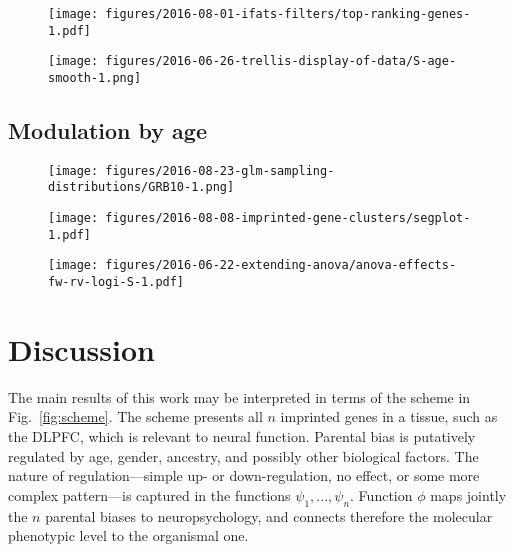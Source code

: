 \documentclass[letterpaper]{article}
\begin{document}
\begin{figure}
\begin{center}
\texttt{[image: figures/2016-08-01-ifats-filters/top-ranking-genes-1.pdf]}
\caption{}
\label{fig:top-genes}
\end{center}
\end{figure}

\begin{figure}
\begin{center}
\texttt{[image: figures/2016-06-26-trellis-display-of-data/S-age-smooth-1.png]}
\caption{}
\label{fig:S-age-institution}
\end{center}
\end{figure}

\subsection{Modulation by age}

\begin{figure}
\begin{center}
\texttt{[image: figures/2016-08-23-glm-sampling-distributions/GRB10-1.png]}
\end{center}
\caption{}
\label{fig:predicted-curves}
\end{figure}

\begin{figure}
\begin{center}
\texttt{[image: figures/2016-08-08-imprinted-gene-clusters/segplot-1.pdf]}
\end{center}
\caption{}
\label{fig:age-effect}
\end{figure}

\begin{figure}
\begin{center}
\texttt{[image: figures/2016-06-22-extending-anova/anova-effects-fw-rv-logi-S-1.pdf]}
\end{center}
\caption{}
\label{fig:anova}
\end{figure}

\section{Discussion}

The main results of this work may be interpreted in terms of the scheme in
Fig.~\ref{fig:scheme}.  The scheme presents all \(n\) imprinted genes in a
tissue, such as the DLPFC, which is relevant to neural function.  Parental
bias is putatively regulated by age, gender, ancestry, and possibly other
biological factors.  The nature of regulation---simple up- or down-regulation,
no effect, or some more complex pattern---is captured in the functions
\(\psi_1,...,\psi_n\).  Function \(\phi\) maps jointly the \(n\) parental
biases to neuropsychology, and connects therefore the molecular phenotypic
level to the organismal one.
\end{document}
